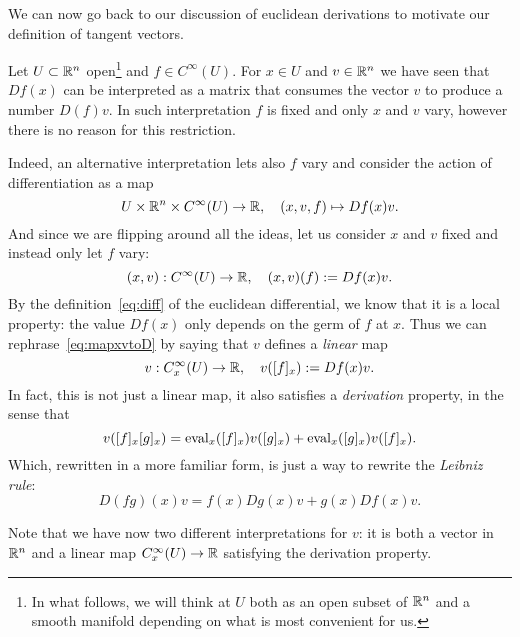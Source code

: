 We can now go back to our discussion of euclidean derivations to motivate our definition of tangent vectors.

\begin{example}\label{ex:euclideanD}
  Let $U\subset\mathbb{R}^n$ open\footnote{In what follows, we will think at $U$ both as an open subset of $\mathbb{R}^n$ and a smooth manifold depending on what is most convenient for us.} and $f\in C^\infty(U)$.
  For $x\in U$ and $v\in\mathbb{R}^n$ we have seen that $Df(x)$ can be interpreted as a matrix that consumes the vector $v$ to produce a number $D(f)v$.
  In such interpretation $f$ is fixed and only $x$ and $v$ vary, however there is no reason for this restriction.

  Indeed, an alternative interpretation lets also $f$ vary and consider the action of differentiation as a map
  \begin{equation}
    U \times \mathbb{R}^n \times C^\infty(U) \to \mathbb{R},\quad
    (x,v,f) \mapsto Df(x) v.
  \end{equation}
  And since we are flipping around all the ideas, let us consider $x$ and $v$ fixed and instead only let $f$ vary:
  \begin{equation}\label{eq:mapxvtoD}
    (x,v):C^\infty(U) \to\mathbb{R}, \quad (x,v)(f) := Df(x)v.
  \end{equation}
  By the definition~\eqref{eq:diff} of the euclidean differential, we know that it is a local property: the value $Df(x)$ only depends on the germ of $f$ at $x$.
  Thus we can rephrase~\eqref{eq:mapxvtoD} by saying that $v$ defines a \emph{linear} map
  \begin{equation}
    v : C_x^\infty(U) \to \mathbb{R}, \quad
    v([f]_x) := Df(x) v.
  \end{equation}
  In fact, this is not just a linear map, it also satisfies a \emph{derivation} property, in the sense that
  \begin{equation}
    v([f]_x [g]_x) =
      \operatorname{eval}_x([f]_x)v([g]_x)
      + \operatorname{eval}_x([g]_x)v([f]_x).
  \end{equation}
  Which, rewritten in a more familiar form, is just a way to rewrite the \emph{Leibniz rule}:
  \begin{equation}
    D(fg)(x) v = f(x)Dg(x)v + g(x) Df(x)v.
  \end{equation}

  Note that we have now two different interpretations for $v$: it is both a vector in $\mathbb{R}^n$ and a linear map $C_x^\infty(U) \to \mathbb{R}$ satisfying the derivation property.
\end{example}

